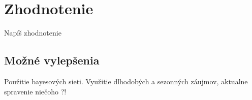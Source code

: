 \newpage

\section{Zhodnotenie}

Napíš zhodnotenie

\subsection{Možné vylepšenia}

Použitie bayesových sieti. Využitie dlhodobých a sezonných záujmov,
aktualne spravenie niečoho ?!
